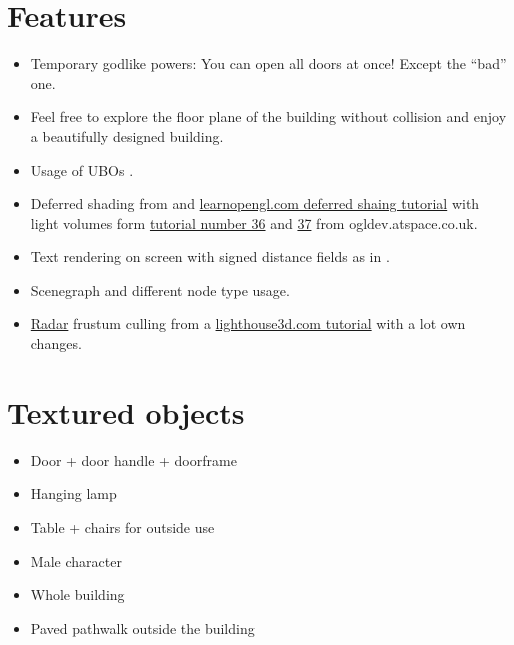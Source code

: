 \documentclass[12pt]{article}
\begin{document}
\section{Features}
\begin{itemize}
	\item Temporary godlike powers: You can open all doors at once! Except the ``bad'' one.
	\item Feel free to explore the floor plane of the building without collision and enjoy a beautifully designed building.
	\item Usage of UBOs \cite{openGLSuperBible}.
	\item Deferred shading from \cite{openGLSuperBible} and \href{http://learnopengl.com/#!Advanced-Lighting/Deferred-Shading}{learnopengl.com deferred shaing tutorial} with light volumes form
	\href{http://ogldev.atspace.co.uk/www/tutorial36/tutorial36.html}{tutorial number 36} and \href{http://ogldev.atspace.co.uk/www/tutorial37/tutorial37.html}{37} from ogldev.atspace.co.uk.
	\item Text rendering on screen with signed distance fields as in \cite{signedDistanceFields}.
	\item Scenegraph and different node type usage.
  \item \href{https://www.youtube.com/watch?v=2LW9JSYn_h0}{Radar} frustum culling from a \href{http://www.lighthouse3d.com/tutorials/view-frustum-culling/radar-approach-implementation-ii}{lighthouse3d.com tutorial} with a lot own changes.
\end{itemize}


\section{Textured objects \label{Texture Mapping}}
\begin{itemize}
\item Door + door handle + doorframe
\item Hanging lamp
\item Table + chairs for outside use
\item Male character
\item Whole building
\item Paved pathwalk outside the building
\end{itemize}
\end{document}
